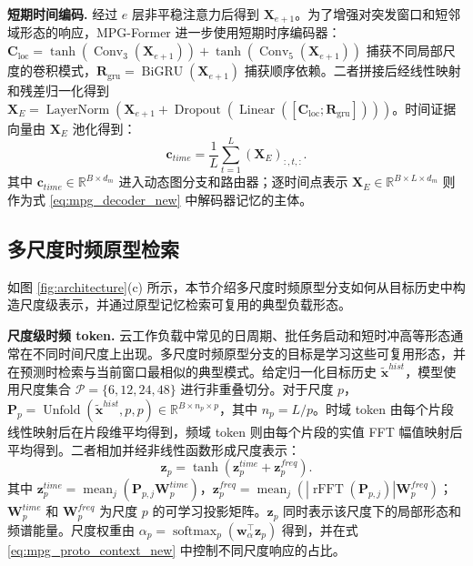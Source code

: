 \documentclass[UTF8]{ctexart}
\begin{document}
\noindent\textbf{短期时间编码.}
经过 $e$ 层非平稳注意力后得到 $\mathbf X_{e+1}$。为了增强对突发窗口和短邻域形态的响应，MPG-Former 进一步使用短期时序编码器：$\mathbf C_{\mathrm{loc}}=\tanh(\operatorname{Conv}_{3}(\mathbf X_{e+1}))+\tanh(\operatorname{Conv}_{5}(\mathbf X_{e+1}))$ 捕获不同局部尺度的卷积模式，$\mathbf R_{\mathrm{gru}}=\operatorname{BiGRU}(\mathbf X_{e+1})$ 捕获顺序依赖。二者拼接后经线性映射和残差归一化得到 $\mathbf X_E=\operatorname{LayerNorm}(\mathbf X_{e+1}+\operatorname{Dropout}(\operatorname{Linear}([\mathbf C_{\mathrm{loc}};\mathbf R_{\mathrm{gru}}])))$。时间证据向量由 $\mathbf X_E$ 池化得到：
\begin{equation}
    \mathbf c_{time}=\frac{1}{L}\sum_{t=1}^{L}(\mathbf X_E)_{:,t,:}.
    \label{eq:mpg_time_context_new}
\end{equation}
其中 $\mathbf c_{time}\in\mathbb R^{B\times d_m}$ 进入动态图分支和路由器；逐时间点表示 $\mathbf X_E\in\mathbb R^{B\times L\times d_m}$ 则作为式 \eqref{eq:mpg_decoder_new} 中解码器记忆的主体。

\subsection{多尺度时频原型检索}
\label{sec:prototype_evidence}

如图 \ref{fig:architecture}(c) 所示，本节介绍多尺度时频原型分支如何从目标历史中构造尺度级表示，并通过原型记忆检索可复用的典型负载形态。

\noindent\textbf{尺度级时频 token.}
云工作负载中常见的日周期、批任务启动和短时冲高等形态通常在不同时间尺度上出现。多尺度时频原型分支的目标是学习这些可复用形态，并在预测时检索与当前窗口最相似的典型模式。给定归一化目标历史 $\tilde{\mathbf x}^{hist}$，模型使用尺度集合 $\mathcal P=\{6,12,24,48\}$ 进行非重叠切分。对于尺度 $p$，$\mathbf P_p=\operatorname{Unfold}(\tilde{\mathbf x}^{hist},p,p)\in\mathbb R^{B\times n_p\times p}$，其中 $n_p=L/p$。时域 token 由每个片段线性映射后在片段维平均得到，频域 token 则由每个片段的实值 FFT 幅值映射后平均得到。二者相加并经非线性函数形成尺度表示：
\begin{equation}
    \mathbf z_p=\tanh(\mathbf z^{time}_p+\mathbf z^{freq}_p).
    \label{eq:mpg_scale_token_new}
\end{equation}
其中 $\mathbf z^{time}_p=\operatorname{mean}_{j}(\mathbf P_{p,j}\mathbf W^{time}_p)$，$\mathbf z^{freq}_p=\operatorname{mean}_{j}(|\operatorname{rFFT}(\mathbf P_{p,j})|\mathbf W^{freq}_p)$；$\mathbf W^{time}_p$ 和 $\mathbf W^{freq}_p$ 为尺度 $p$ 的可学习投影矩阵。$\mathbf z_p$ 同时表示该尺度下的局部形态和频谱能量。尺度权重由 $\alpha_p=\operatorname{softmax}_{p}(\mathbf w_{\alpha}^{\top}\mathbf z_p)$ 得到，并在式 \eqref{eq:mpg_proto_context_new} 中控制不同尺度响应的占比。
\end{document}
